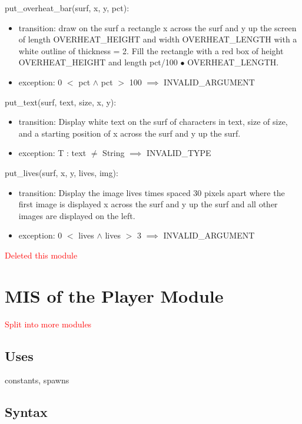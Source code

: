 \documentclass[12pt, titlepage]{article}
\begin{document}
\noindent put\_overheat\_bar(surf, x, y, pct):
\begin{itemize}
\item transition: 
draw on the surf a rectangle x across the surf and y up the screen of length OVERHEAT\_HEIGHT and width OVERHEAT\_LENGTH with a white outline of thickness = 2. Fill the rectangle with a red box of height OVERHEAT\_HEIGHT and length pct/100 $\bullet$ OVERHEAT\_LENGTH.

\item exception: 0 $<$ pct $\wedge$ pct $>$ 100 $\implies$ INVALID\_ARGUMENT
\end{itemize}

\noindent put\_text(surf, text, size, x, y):
\begin{itemize}
\item transition: 
Display white text on the surf of characters in text, size of size, and a starting position of x across the surf and y up the surf.

\item exception: T : text $\neq$ String $\implies$ INVALID\_TYPE
\end{itemize}

\noindent put\_lives(surf, x, y, lives, img):
\begin{itemize}
\item transition: 
Display the image lives times spaced 30 pixels apart where the first image is displayed x across the surf and y up the surf and all other images are displayed on the left.
\item exception: 0 $<$ lives $\wedge$ lives $>$ 3 $\implies$ INVALID\_ARGUMENT
\end{itemize}


\textcolor{red}{Deleted this module}
\section {MIS of the Player Module}

\textcolor{red}{Split into more modules}

\subsection {Uses}

constants, spawns

\subsection {Syntax}
\end{document}
